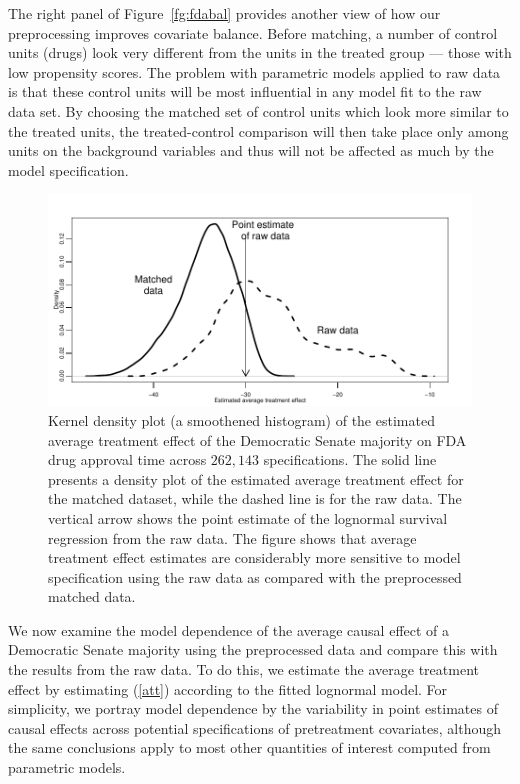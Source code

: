 \documentclass[11pt,titlepage]{article}
\begin{document}
The right panel of Figure~\ref{fg:fdabal} provides another view of how
our preprocessing improves covariate balance.  Before matching, a
number of control units (drugs) look very different from the units in
the treated group --- those with low propensity scores.  The problem
with parametric models applied to raw data is that these control units
will be most influential in any model fit to the raw data set.  By
choosing the matched set of control units which look more similar to
the treated units, the treated-control comparison will then take place
only among units on the background variables and thus will not be
affected as much by the model specification.
\begin{figure}[t] 
 \begin{center}
   \includegraphics{figs/fdadens.pdf}
  \end{center}
  \vspace{-0.275in}
  \caption{Kernel density plot (a smoothened histogram)
    of the estimated average treatment effect of the Democratic Senate
    majority on FDA drug approval time across $262,143$
    specifications. The solid line presents a density plot of the
    estimated average treatment effect for the matched dataset, while
    the dashed line is for the raw data.  The vertical arrow shows the
    point estimate of the lognormal survival regression from the raw
    data.  The figure shows that average treatment effect estimates
    are considerably more sensitive to model specification using the
    raw data as compared with the preprocessed matched data.}
  \label{fg:fdadens}
\end{figure}

We now examine the model dependence of the average causal effect of
a Democratic Senate majority using the preprocessed data and compare
this with the results from the raw data.  To do this, we estimate the
average treatment effect by estimating (\ref{att}) according to the
fitted lognormal model.  For simplicity, we portray model dependence
by the variability in point estimates of causal effects across
potential specifications of pretreatment covariates, although the
same conclusions apply to most other quantities of interest computed
from parametric models.
\end{document}
